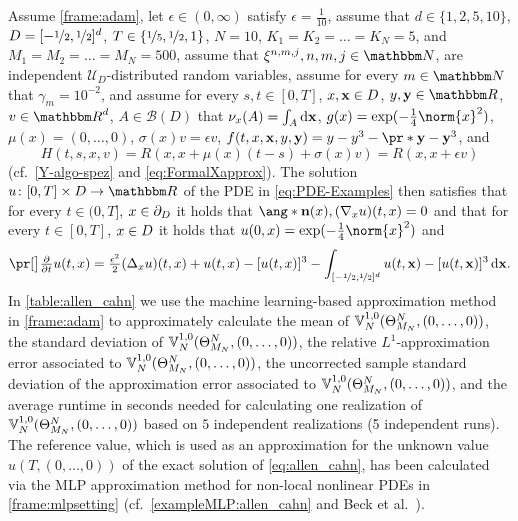 Assume 
	\cref{frame:adam}, 
let
	$\epsilon\in(0,\infty)$
satisfy
	$\epsilon = \tfrac{1}{10}$,
assume that
	$d\in\{1,2,5,10\}$,
	$D = [-\nicefrac12,\nicefrac12]^d$,
	$T\in\{\nicefrac{1}{5},\nicefrac{1}{2},1\}$,
	$N=10$,
	$K_1 = K_2 = \ldots = K_N= 5$, and
	$M_1 = M_2 = \ldots = M_N = 500$,
assume that 
	$\xi^{n,m,j}, n, m, j \in \N$,
	are independent $\mathcal{U}_{D}$-distributed random variables,
assume 
	for every 
		$m \in \N$
	that
		$\gamma_m =10^{-2}$,
	and
assume 
	for every 
		$s,t \in [0,T]$, 
		$x,\mathbf{x}
		\in D$, 
		$y,\mathbf{y} \in \R$,
		$v\in\R^d$,
		$A \in \mathcal{B}(D)$
	that
		$\nu_x(A) = \int_A \mathrm{d}\mathbf{x}$,
		$g(x)= \exp (-\tfrac{1}{4}\norm{x}^2)$,
		$\mu(x)=(0, \dots, 0)$,
		$\sigma(x) v = \epsilon v$, 
		$f(t,x,\mathbf{x},y,\mathbf{y}
		)=  y - y^3 - \pr*{ \mathbf{y} - \mathbf{y}^3}$, and
	\begin{equation}
		\label{eq:Hallencahn}
		H(t,s,x,v) 
		=
		R(x,x+\mu(x)(t-s)+\sigma(x)v)
		=
		R(x,x+\epsilon v)
	\end{equation}
	(cf.\ \eqref{Y-algo-spez} and \eqref{eq:FormalXapprox}).
The solution 
	$u\colon[0,T]\times \D \to \R$ 
	of the PDE in \eqref{eq:PDE-Examples} then satisfies that 
		for every
		$t\in (0,T]$, 
		$x\in\partial_D$
	it holds that
		$\ang*{\mathbf{n}(x) ,(\nabla_x u)(t,x)} = 0$
	and that for every
			$t\in [0,T]$, 
			$x\in D$ 
		it holds that 
			$u(0,x)=\exp (-\tfrac{1}{4}\norm{x}^2)$ and
		\begin{equation}
			\bpr{\tfrac{\partial}{\partial t}u}(t,x)
			=
			\tfrac{\epsilon^2}{2} (\Delta_x u)(t,x) + u(t,x) - [u(t,x)]^3 - \int_{[-\nicefrac12,\nicefrac12]^d} u(t,\mathbf{x}) - [u(t,\mathbf{x})]^3 \,\diff\mathbf{x}
			.
		\label{eq:allen_cahn}
		\end{equation}
%
%
In \cref{table:allen_cahn}
we use the machine learning-based approximation method
in \cref{frame:adam}
to approximately calculate
the mean of %
$
{\mathbb{V}}^{1,0}_N(\Theta^N_{M_N},\allowbreak (0,\ldots,0))
$,
the standard deviation of %
$
{\mathbb{V}}^{1,0}_N(\Theta^N_{M_N},\allowbreak (0,\ldots,0))
$,
the relative $ L^1 $-approximation error associated to %
$
{\mathbb{V}}^{1,0}_N(\Theta^N_{M_N},\allowbreak (0,\ldots,\allowbreak 0))
$,
the uncorrected sample standard deviation of the approximation error associated to %
$
{\mathbb{V}}^{1,0}_N(\Theta^N_{M_N},\allowbreak (0,\ldots,0))
$,
and the average runtime in seconds needed for calculating one realization of $
{\mathbb{V}}^{1,0}_N(\Theta^N_{M_N},\allowbreak (0,\ldots,0))
$
%
based on $5$ independent realizations (5 independent runs).
%
The reference value, which is used as an approximation for the unknown value $u(T,(0,\ldots,0))$
of the exact solution of \eqref{eq:allen_cahn}, has been calculated via the MLP approximation method for non-local nonlinear PDEs in \cref{frame:mlpsetting} (cf.~\cref{exampleMLP:allen_cahn} and Beck et al.~\cite[Remark~3.3]{Beck2017a}).

